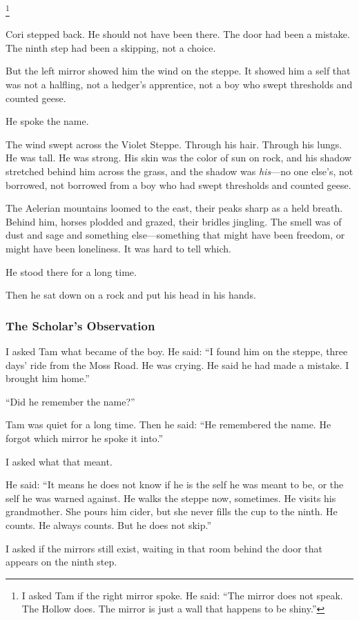 \documentclass[12pt]{article}
\begin{document}
\footnote{I asked Tam if the right mirror spoke. He said: ``The mirror does not speak. The Hollow does. The mirror is just a wall that happens to be shiny.''}

Cori stepped back. He should not have been there. The door had been a mistake. The ninth step had been a skipping, not a choice.

But the left mirror showed him the wind on the steppe. It showed him a self that was not a halfling, not a hedger's apprentice, not a boy who swept thresholds and counted geese.

He spoke the name.

The wind swept across the Violet Steppe. Through his hair. Through his lungs. He was tall. He was strong. His skin was the color of sun on rock, and his shadow stretched behind him across the grass, and the shadow was \textit{his}---no one else's, not borrowed, not borrowed from a boy who had swept thresholds and counted geese.

The Aelerian mountains loomed to the east, their peaks sharp as a held breath. Behind him, horses plodded and grazed, their bridles jingling. The smell was of dust and sage and something else---something that might have been freedom, or might have been loneliness. It was hard to tell which.

He stood there for a long time.

Then he sat down on a rock and put his head in his hands.

\subsubsection{The Scholar's Observation}
I asked Tam what became of the boy. He said: ``I found him on the steppe, three days' ride from the Moss Road. He was crying. He said he had made a mistake. I brought him home.''

``Did he remember the name?''

Tam was quiet for a long time. Then he said: ``He remembered the name. He forgot which mirror he spoke it into.''

I asked what that meant.

He said: ``It means he does not know if he is the self he was meant to be, or the self he was warned against. He walks the steppe now, sometimes. He visits his grandmother. She pours him cider, but she never fills the cup to the ninth. He counts. He always counts. But he does not skip.''

I asked if the mirrors still exist, waiting in that room behind the door that appears on the ninth step.
\end{document}
